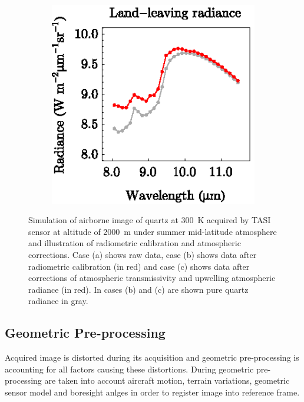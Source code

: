 \begin{figure}[htb]
	\hspace{1em}
	\begin{subfigure}[t]{.3\linewidth}
		\centering
		\includegraphics[scale=1]{pics/Chapter_02/calibration-3-Lll.eps}
		\vspace{-0.4cm}
		\caption{}
	\end{subfigure}
	\vspace{1.5 em}
	\caption{Simulation of airborne image of quartz at \SI{300}{\kelvin} acquired by TASI sensor at altitude of \SI{2000}{\meter} under summer mid-latitude atmosphere and illustration of radiometric calibration and atmospheric corrections. Case (a) shows raw data, case (b) shows data after radiometric calibration (in red) and case (c) shows data after corrections of atmospheric transmissivity and upwelling atmospheric radiance (in red). In cases (b) and (c) are shown pure quartz radiance in gray.}
	\label{fig:RadAtmCorOfQuartz}
\end{figure}

\subsection{Geometric Pre-processing}

Acquired image is distorted during its acquisition and geometric pre-processing is accounting for all factors causing these distortions. During geometric pre-processing are taken into account aircraft motion, terrain variations, geometric sensor model and boresight anlges in order to register image into reference frame.

